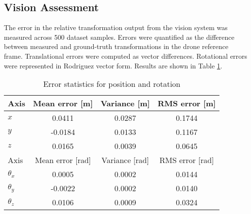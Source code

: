 \documentclass[bare_jrnl_transmag]{subfiles}
\begin{document}
\subsection{Vision Assessment}
The error in the relative transformation output from the vision system was measured across 500 dataset samples. Errors were quantified as the difference between measured and ground-truth transformations in the drone reference frame. Translational errors were computed as vector differences. Rotational errors were represented in Rodriguez vector form. Results are shown in Table \ref{tab:vision-error-stats}.

\begin{table}[htbp]
    \centering
    \begin{tabular}{lccc}
    \hline
    Axis & Mean error [m] & Variance [m] & RMS error [m] \\ \hline
    $x$ & 0.0411 & 0.0287 & 0.1744 \\
    $y$ & -0.0184 & 0.0133 & 0.1167 \\
    $z$ & 0.0165 & 0.0039 & 0.0645 \\ \hline
    Axis & Mean error [rad] & Variance [rad] & RMS error [rad] \\ \hline
    $\theta_x$ & 0.0005 & 0.0002 & 0.0144 \\
    $\theta_y$ & -0.0022 & 0.0002 & 0.0140 \\
    $\theta_z$ & 0.0106 & 0.0009 & 0.0324 \\ \hline
    \end{tabular}
    \caption{Error statistics for position and rotation}
    \label{tab:vision-error-stats}
    \end{table}
\end{document}
